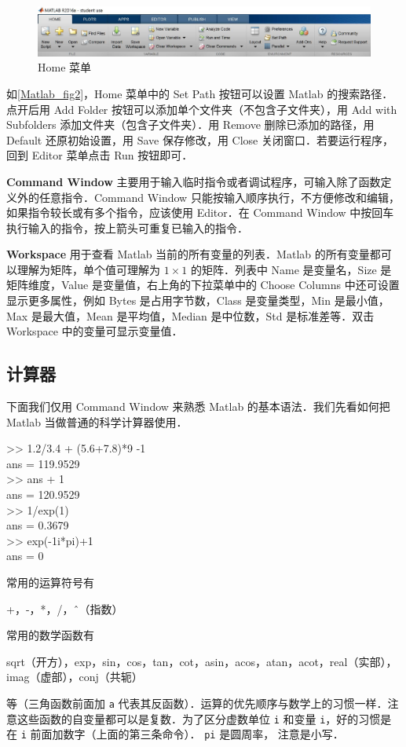 \begin{figure}[ht]
\centering
\includegraphics[width= 14cm]{./figures/Matlab2.pdf}
\caption{Home 菜单}\label{Matlab_fig2}
\end{figure}

如\autoref{Matlab_fig2}，Home 菜单中的 Set Path 按钮可以设置 Matlab 的搜索路径．点开后用 Add Folder 按钮可以添加单个文件夹（不包含子文件夹），用 Add with Subfolders 添加文件夹（包含子文件夹）．用 Remove 删除已添加的路径，用 Default 还原初始设置，用 Save 保存修改，用 Close 关闭窗口．若要运行程序，回到 Editor 菜单点击 Run 按钮即可．

\textbf{Command Window} 主要用于输入临时指令或者调试程序，可输入除了函数定义外的任意指令．Command Window 只能按输入顺序执行，不方便修改和编辑，如果指令较长或有多个指令，应该使用 Editor．在 Command Window 中按回车执行输入的指令，按上箭头可重复已输入的指令．

\textbf{Workspace} 用于查看 Matlab 当前的所有变量的列表．Matlab 的所有变量都可以理解为矩阵，单个值可理解为 $1\times 1$ 的矩阵．列表中 Name 是变量名，Size 是矩阵维度，Value 是变量值，右上角的下拉菜单中的 Choose Columns 中还可设置显示更多属性，例如 Bytes 是占用字节数，Class 是变量类型，Min 是最小值，Max 是最大值，Mean 是平均值，Median 是中位数，Std 是标准差等．双击 Workspace 中的变量可显示变量值．

\subsection{计算器}
下面我们仅用 Command Window 来熟悉 Matlab 的基本语法．我们先看如何把 Matlab 当做普通的科学计算器使用．
\begin{Command}
>> 1.2/3.4 + (5.6+7.8)*9 -1 \\
ans = 119.9529 \\
>> ans + 1\\
ans = 120.9529\\
>> 1/exp(1) \\
ans = 0.3679 \\
>> exp(-1i*pi)+1 \\
ans = 0
\end{Command}
常用的运算符号有
\begin{Command}
+，-，*，/，\^\ （指数）
\end{Command}
常用的数学函数有
\begin{Command}
sqrt（开方），exp，sin，cos，tan，cot，asin，acos，atan，acot，real（实部），imag（虚部），conj（共轭）
\end{Command}
等（三角函数前面加 \texttt{a} 代表其反函数）．运算的优先顺序与数学上的习惯一样．注意这些函数的自变量都可以是复数．为了区分虚数单位 \texttt{i} 和变量 \texttt{i}，好的习惯是在 \texttt{i} 前面加数字（上面的第三条命令）． \texttt{pi} 是圆周率， 注意是小写．

